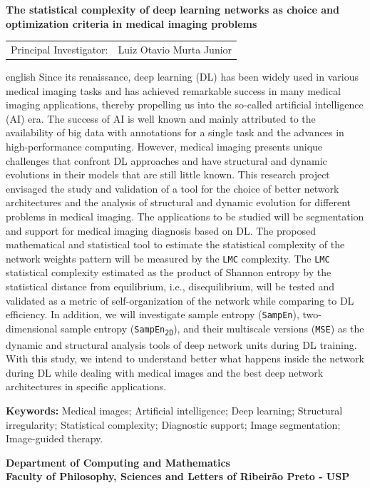 \documentclass[
	12pt,				%
	openany,oneside,
	a4paper,			%
	english,			%
	brazil,				%
	]{abntex2}
\begin{document}
\begin{center}
\textbf{\centering\Large The statistical complexity of deep learning networks as choice and optimization criteria in medical imaging problems}
\end{center}

\begin{tabular}{c@{\hskip 2cm}c}
Principal Investigator: & Luiz Otavio Murta Junior 
\end{tabular}

\setlength{\absparsep}{12pt} %
\begin{resumo}[Abstract]
 \begin{otherlanguage*}{english}
Since its renaissance, deep learning (DL) has been widely used in various medical imaging tasks and has achieved remarkable success in many medical imaging applications, thereby propelling us into the so-called artificial intelligence (AI) era. The success of AI is well known and mainly attributed to the availability of big data with annotations for a single task and the advances in high-performance computing. However, medical imaging presents unique challenges that confront DL approaches and have structural and dynamic evolutions in their models that are still little known. This research project envisaged the study and validation of a tool for the choice of better network architectures and the analysis of structural and dynamic evolution for different problems in medical imaging. The applications to be studied will be segmentation and support for medical imaging diagnosis based on DL. The proposed mathematical and statistical tool to estimate the statistical complexity of the network weights pattern will be measured by the \texttt{LMC} complexity. The \texttt{LMC} statistical complexity estimated as the product of Shannon entropy by the statistical distance from equilibrium, i.e., disequilibrium, will be tested and validated as a metric of self-organization of the network while comparing to DL efficiency. In addition, we will investigate sample entropy (\texttt{SampEn}), two-dimensional sample entropy (\texttt{SampEn\textsubscript{2D}}), and their multiscale versions (\texttt{MSE}) as the dynamic and structural analysis tools of deep network units during DL training. With this study, we intend to understand better what happens inside the network during DL while dealing with medical images and the best deep network architectures in specific applications.

\textbf{Keywords: }Medical images; Artificial intelligence; Deep learning; Structural irregularity; Statistical complexity; Diagnostic support; Image segmentation; Image-guided therapy.

\textbf{\centering\large Department of Computing and Mathematics \\
					Faculty of Philosophy, Sciences and Letters of Ribeirão Preto - USP}
 \end{otherlanguage*}
\end{resumo}
\clearpage
\end{document}
